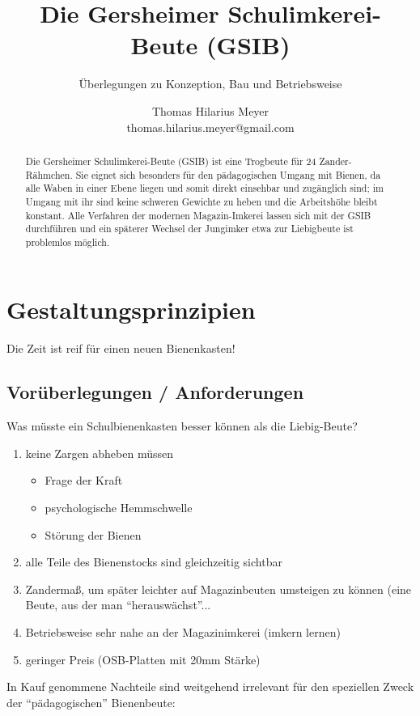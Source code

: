 \documentclass[12pt,a4paper,ngerman]{scrartcl}
\author{Thomas Hilarius Meyer\\ \textsf{thomas.hilarius.meyer@gmail.com}}
\title{Die Gersheimer Schulimkerei-Beute (GSIB)}
\subtitle{Überlegungen zu Konzeption, Bau und Betriebsweise}
\begin{document}
	\maketitle

\begin{abstract}
	Die Gersheimer Schulimkerei-Beute (GSIB) ist eine Trogbeute für 24 Zander-Rähmchen.
	Sie eignet sich besonders für den pädagogischen Umgang mit Bienen, da alle Waben in einer
	Ebene liegen und somit direkt einsehbar und zugänglich sind; im Umgang mit ihr sind
	keine schweren Gewichte zu heben und die Arbeitshöhe bleibt konstant.
	Alle Verfahren der modernen Magazin-Imkerei lassen sich mit der GSIB durchführen und
	ein späterer Wechsel der Jungimker etwa zur Liebigbeute ist problemlos möglich.
\end{abstract}

\section{Gestaltungsprinzipien}

Die Zeit ist reif für einen neuen Bienenkasten!


\subsection{Vorüberlegungen / Anforderungen}

Was müsste ein Schulbienenkasten besser können als die Liebig-Beute?

\begin{enumerate}
\item keine Zargen abheben müssen
  \begin{itemize}
  \item Frage der Kraft
  \item psychologische Hemmschwelle
  \item Störung der Bienen
  \end{itemize}
\item alle Teile des Bienenstocks sind gleichzeitig sichtbar
\item Zandermaß, um später leichter auf Magazinbeuten umsteigen zu können (eine Beute, aus der man \enquote{herauswächst}...
\item Betriebsweise sehr nahe an der Magazinimkerei (imkern lernen)
\item geringer Preis (OSB-Platten mit 20mm Stärke)
\end{enumerate}

In Kauf genommene Nachteile sind weitgehend irrelevant für den speziellen Zweck der \enquote{pädagogischen} Bienenbeute:
\end{document}
